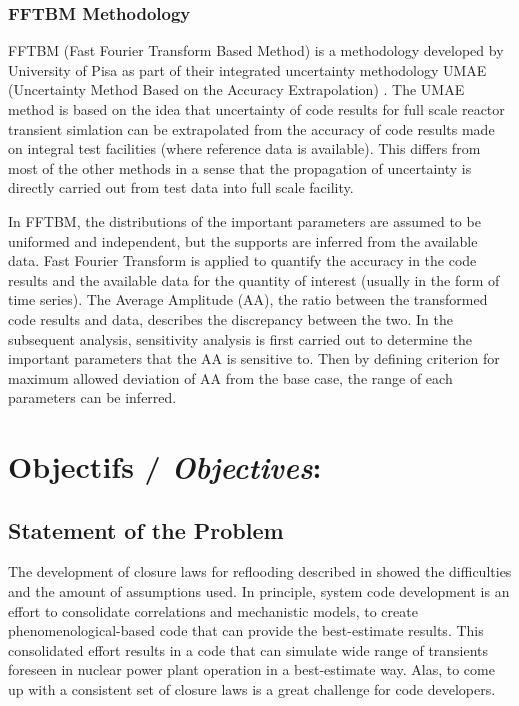 \documentclass[11pt,titlepage]{article}
\begin{document}
\subsubsection{FFTBM Methodology}

FFTBM (Fast Fourier Transform Based Method) is a methodology developed by University of Pisa as part of their integrated uncertainty methodology UMAE (Uncertainty Method Based on the Accuracy Extrapolation) \cite{Prosek2002,DAuria1998}. 
The UMAE method is based on the idea that uncertainty of code results for full scale reactor transient simlation can be extrapolated from the accuracy of code results made on integral test facilities (where reference data is available). 
This differs from most of the other methods in a sense that the propagation of uncertainty is directly carried out from test data into full scale facility.

In FFTBM, the distributions of the important parameters are assumed to be uniformed and independent, but the supports are inferred from the available data. 
Fast Fourier Transform is applied to quantify the accuracy in the code results and the available data for the quantity of interest (usually in the form of time series). 
The Average Amplitude (AA), the ratio between the transformed code results and data, describes the discrepancy between the two. 
In the subsequent analysis, sensitivity analysis is first carried out to determine the important parameters that the AA is sensitive to. 
Then by defining criterion for maximum allowed deviation of AA from the base case, the range of each parameters can be inferred.

\newpage
\section{Objectifs /  {\large\textit{Objectives}}:}

\subsection{Statement of the Problem}

The development of closure laws for reflooding described in \cite{Nelson1992} showed the difficulties and the amount of assumptions used. 
In principle, system code development is an effort to consolidate correlations and mechanistic models, to create phenomenological-based code that can provide the best-estimate results. 
This consolidated effort results in a code that can simulate wide range of transients foreseen in nuclear power plant operation in a best-estimate way. 
Alas, to come up with a consistent set of closure laws is a great challenge for code developers.
\end{document}
